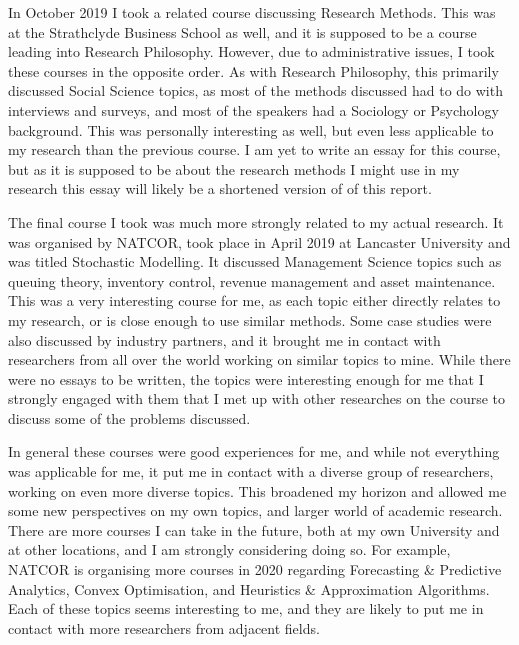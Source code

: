 \documentclass[a4paper,12pt]{article}
\begin{document}
\bigskip

In October 2019 I took a related course discussing Research Methods. This was at the Strathclyde Business School as well, and it is supposed to be a course leading into Research Philosophy. However, due to administrative issues, I took these courses in the opposite order. As with Research Philosophy, this primarily discussed Social Science topics, as most of the methods discussed had to do with interviews and surveys, and most of the speakers had a Sociology or Psychology background. This was personally interesting as well, but even less applicable to my research than the previous course. I am yet to write an essay for this course, but as it is supposed to be about the research methods I might use in my research this essay will likely be a shortened version of  of this report. 

\bigskip

The final course I took was much more strongly related to my actual research. It was organised by NATCOR, took place in April 2019 at Lancaster University and was titled Stochastic Modelling. It discussed Management Science topics such as queuing theory, inventory control, revenue management and asset maintenance. This was a very interesting course for me, as each topic either directly relates to my research, or is close enough to use similar methods. Some case studies were also discussed by industry partners, and it brought me in contact with researchers from all over the world working on similar topics to mine. While there were no essays to be written, the topics were interesting enough for me that I strongly engaged with them that I met up with other researches on the course to discuss some of the problems discussed. 

\bigskip

In general these courses were good experiences for me, and while not everything was applicable for me, it put me in contact with a diverse group of researchers, working on even more diverse topics. This broadened my horizon and allowed me some new perspectives on my own topics, and larger world of academic research. There are more courses I can take in the future, both at my own University and at other locations, and I am strongly considering doing so. For example, NATCOR is organising more courses in 2020 regarding Forecasting \& Predictive Analytics, Convex Optimisation, and Heuristics \& Approximation Algorithms. Each of these topics seems interesting to me, and they are likely to put me in contact with more researchers from adjacent fields. 
\end{document}

